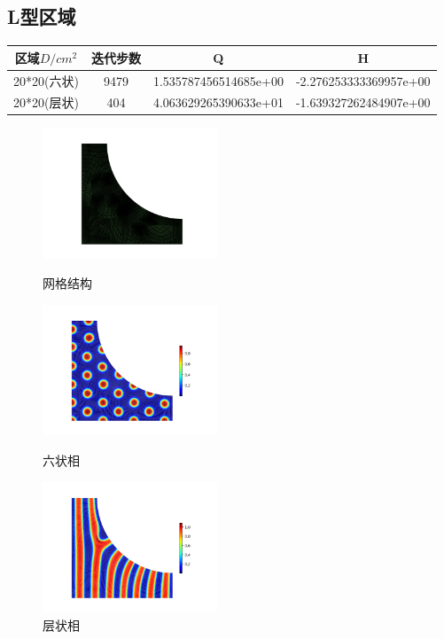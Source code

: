 \documentclass[12pt]{article}
\begin{document}
\begin{CJK}{UTF8}{gkai}
  \subsection{L型区域}   
  \begin{table}[H]
  		\centering
  	\begin{tabular}{cccc}
  		\toprule
  		区域$D/cm^2$ &	迭代步数 & Q &  H \\
  		\midrule
  		20*20(六状)&9479 &1.535787456514685e+00 & -2.276253333369957e+00\\
  		20*20(层状)&404& 4.063629265390633e+01 & -1.639327262484907e+00\\
  		\bottomrule
  	\end{tabular}
  \end{table}
  
  \begin{figure}[H]
  	\setlength{\abovecaptionskip}{0.cm}
  	\setlength{\belowcaptionskip}{-0.cm}
  	\begin{minipage}[!htbp]{0.3\linewidth}
  		\includegraphics[width=5.2cm]{Figure_Lc.png}
  		\caption*{网格结构}
  	\end{minipage}
  	\hspace{0.23in}
  	\begin{minipage}[!htbp]{0.3\linewidth}
  		\includegraphics[width=5.2cm]{scftfigure9480.png}
  		\caption*{六状相}
  	\end{minipage}
  	\hspace{0.23in}
  	\begin{minipage}[!htbp]{0.3\linewidth}
  		\includegraphics[width=5.2cm]{scftfigure400.png}
  		\caption*{层状相}
  	\end{minipage}
  \end{figure}

\end{CJK}
\end{document}
